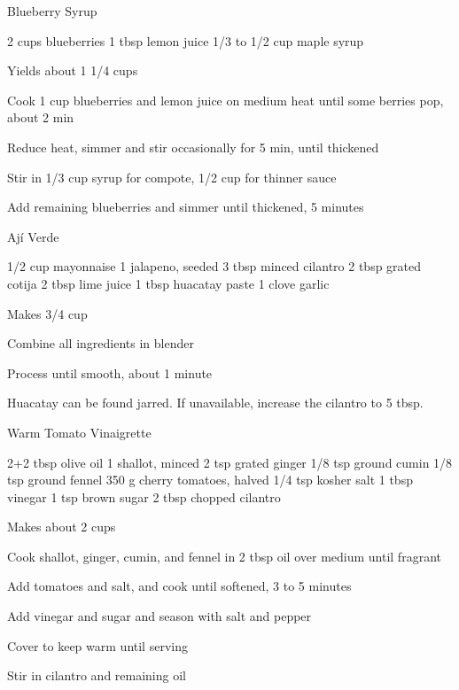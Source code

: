 \begin{recipe}{Blueberry Syrup}{}
\begin{ingredients}
2 cups blueberries
1 tbsp lemon juice
1/3 to 1/2 cup maple syrup
\end{ingredients}
\nextcolumn
Yields about 1 1/4 cups
\begin{steps}
\item Cook 1 cup blueberries and lemon juice on medium heat until some berries pop, about 2 min
\item Reduce heat, simmer and stir occasionally for 5 min, until thickened
\item Stir in 1/3 cup syrup for compote, 1/2 cup for thinner sauce
\item Add remaining blueberries and simmer until thickened, 5 minutes
\end{steps}
\end{recipe}

\begin{recipe}{Ají Verde}{}
\begin{ingredients}
1/2 cup mayonnaise
1 jalapeno, seeded
3 tbsp minced cilantro
2 tbsp grated cotija
2 tbsp lime juice
1 tbsp huacatay paste
1 clove garlic
\end{ingredients}
\nextcolumn
Makes 3/4 cup
\begin{steps}
    \item Combine all ingredients in blender
    \item Process until smooth, about 1 minute
\end{steps}
Huacatay can be found jarred. If unavailable, increase the cilantro to 5 tbsp.
\end{recipe}

\begin{recipe}{Warm Tomato Vinaigrette}{}
\begin{ingredients}
2+2 tbsp olive oil
1 shallot, minced
2 tsp grated ginger
1/8 tsp ground cumin
1/8 tsp ground fennel
350 g cherry tomatoes, halved
1/4 tsp kosher salt
1 tbsp vinegar
1 tsp brown sugar
2 tbsp chopped cilantro
\end{ingredients}
\nextcolumn
Makes about 2 cups
\begin{steps}
    \item Cook shallot, ginger, cumin, and fennel in 2 tbsp oil over medium until fragrant
    \item Add tomatoes and salt, and cook until softened, 3 to 5 minutes
    \item Add vinegar and sugar and season with salt and pepper
    \item Cover to keep warm until serving
    \item Stir in cilantro and remaining oil
\end{steps}
\end{recipe}

